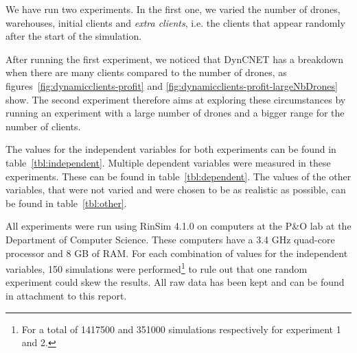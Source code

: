 \documentclass[10pt,a4paper,twocolumn]{article}
\begin{document}
We have run two experiments. In the first one, we varied the number of drones, warehouses, initial clients and \textit{extra clients}, i.e. the clients that appear randomly after the start of the simulation. 

After running the first experiment, we noticed that DynCNET has a breakdown when there are many clients compared to the number of drones, as figures~\ref{fig:dynamicclients-profit} and \ref{fig:dynamicclients-profit-largeNbDrones} show. The second experiment therefore aims at exploring these circumstances by running an experiment with a large number of drones and a bigger range for the number of clients.

The values for the independent variables for both experiments can be found in table~\ref{tbl:independent}. Multiple dependent variables were measured in these experiments. These can be found in table~\ref{tbl:dependent}.  The values of the other variables, that were not varied and were chosen to be as realistic as possible, can be found in table~\ref{tbl:other}.

All experiments were run using RinSim 4.1.0 on computers at the P\&O lab at the Department of Computer Science. These computers have a 3.4 GHz quad-core processor and 8 GB of RAM. For each combination of values for the independent variables, 150 simulations were performed\footnote{For a total of 1417500 and 351000 simulations respectively for experiment 1 and 2.} to rule out that one random experiment could skew the results. All raw data has been kept and can be found in attachment to this report.
\end{document}
